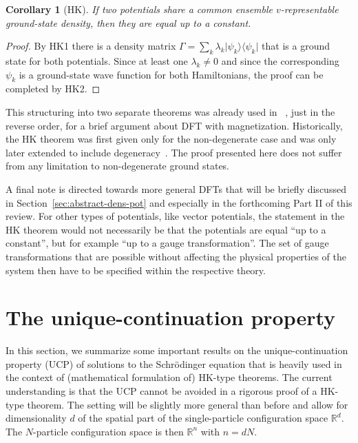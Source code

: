 \documentclass[journal=apcach,manuscript=article,layout=twocolumn]{achemso}
\newtheorem{corollary}[theorem]{Corollary}
\newcommand{\R}{\mathbb{R}}
\newcommand{\changed}[1] {{ {#1}}} %
\begin{document}
\begin{corollary}[HK]
If two potentials share a common ensemble $v$-representable ground-state density, then they are equal up to a constant.
\end{corollary}

\begin{proof}
By HK1 there is a density matrix $\Gamma = \sum_k \lambda_k \vert \psi_k \rangle \langle \psi_k \vert$ that is a ground state for both potentials. Since at least one $\lambda_k \neq 0$ and since the corresponding $\psi_k$ is a ground-state wave function for both Hamiltonians, the proof can be completed by HK2.
\end{proof}



This structuring into two separate theorems was already used in \citeauthor{kohn2004hohenberg}~\cite{kohn2004hohenberg}, just in the reverse order, for a brief argument about DFT with magnetization.
Historically, the HK theorem was first given only for the non-degenerate case and was only later extended to include degeneracy~\changed{\cite{ENGLISCH1983,Kohn1985}}. The proof presented here does not suffer from any limitation to non-degenerate ground states.

A final note is directed towards more general DFTs that will be briefly discussed in Section~\ref{sec:abstract-dens-pot} and especially in the forthcoming Part II of this review. For other types of potentials, like vector potentials, the statement in the HK theorem would not necessarily be that the potentials are equal ``up to a constant'', but for example ``up to a gauge transformation''. The set of gauge transformations that are possible without affecting the physical properties of the system then have to be specified within the respective theory.

\section{The unique-continuation property}
\label{sec:UCP}

In this section, we summarize some important results on the unique-continuation property (UCP) of solutions to the Schr\"odinger equation that is heavily used in the context of (mathematical formulation of) HK-type theorems. The current understanding is that the UCP cannot be avoided in a rigorous proof of a HK-type theorem.
The setting will be slightly more general than before and allow for dimensionality $d$ of the spatial part of the single-particle configuration space $\R^d$. The $N$-particle configuration space is then $\R^{n}$ with $n=dN$.
\end{document}
